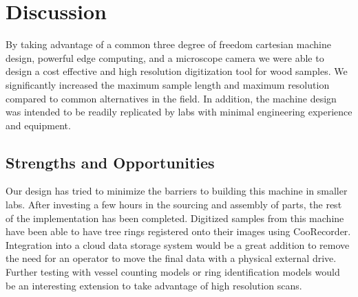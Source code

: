 \documentclass[a4paper,12pt]{article}
\begin{document}
\section{Discussion} %
By taking advantage of a common three degree of freedom cartesian machine design, powerful edge computing, and a microscope camera we were able to design a cost effective and high resolution digitization tool for wood samples. 
We significantly increased the maximum sample length and maximum resolution compared to common alternatives in the field. 
In addition, the machine design was intended to be readily replicated by labs with minimal engineering experience and equipment. 

\subsection{Strengths and Opportunities}
Our design has tried to minimize the barriers to building this machine in smaller labs. After investing a few hours in the sourcing and assembly of parts, 
the rest of the implementation has been completed. Digitized samples from this machine have been able to have tree rings registered onto their images using CooRecorder.
Integration into a cloud data storage system would be a great addition to remove the need for an operator to move the final data with a physical external drive. 
Further testing with vessel counting models or ring identification models would be an interesting extension to take advantage of high resolution scans. %



\end{document}
